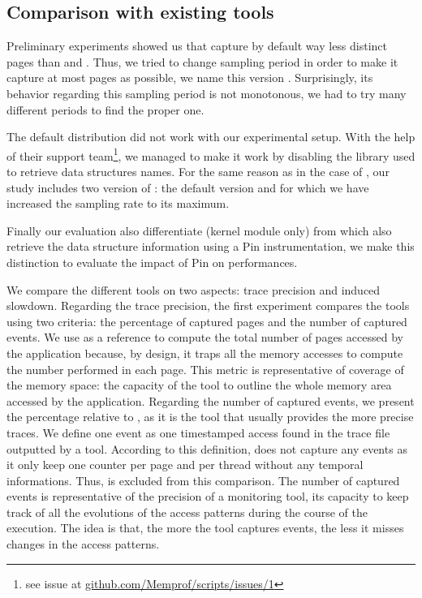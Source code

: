 
\subsection{Comparison with existing tools}
\label{sec:expe-ovh}

Preliminary experiments showed us that \Mitos capture by
default way less distinct pages than \TABARNAC and \Moca. Thus, we tried to change \Mitos
sampling period in order to make it capture at most pages as possible, 
we name this version \MitosTun. Surprisingly, its behavior regarding this sampling period
is not monotonous, we had to try many different periods to find the proper one.

The default \MemProf distribution did not work with our experimental setup. With the help
of their support team\footnote{see issue at
    \href{https://github.com/Memprof/scripts/issues/1}{github.com/Memprof/scripts/issues/1}}, we managed to make it work by disabling the library used to retrieve
data structures names. For the same reason as in the case of \Mitos, our study includes
two version of \MemProf: the default version and \MemProfTun for which we have
increased the sampling rate to its maximum.

Finally our evaluation also differentiate \Moca (kernel module only) from
\MocaPin which also retrieve the data structure information using a Pin
instrumentation, we make this distinction to evaluate the impact of Pin on
\Moca performances.

We compare the different tools on two aspects: trace precision and induced slowdown. Regarding the trace precision, the first experiment compares the tools
using two criteria:  the
percentage of captured pages and the number of captured events.  We use \TABARNAC as a reference to compute the total number of pages accessed by the
application because, by design, it traps all the memory accesses to compute the number performed in each page. This metric is representative of coverage of the
memory space: the capacity of the tool to outline the whole memory area accessed by the application. Regarding the number of captured events, we present the percentage
relative to \Moca, as it is the tool that usually provides the more precise traces. We define one event as one
timestamped access found in the trace file outputted by a tool. According to this definition, \TABARNAC does not capture any events as it only keep one
counter per page and per thread without any temporal informations. Thus, \TABARNAC is excluded from this comparison. The number of captured events is representative
of the precision of a monitoring tool, its capacity to keep track of all the evolutions of the access patterns during the course of the execution. The idea is
that, the more the tool captures events, the less it misses changes in the access patterns.

